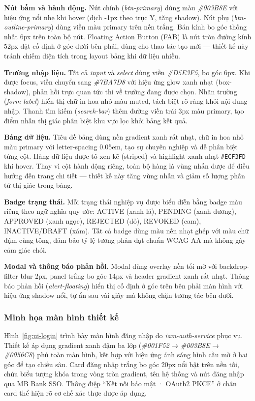 \documentclass[../DoAn.tex]{subfiles}
\begin{document}
\textbf{Nút bấm và hành động.} Nút chính (\textit{btn-primary}) dùng màu \textit{\#003B8E} với hiệu ứng nổi nhẹ khi hover (dịch -1px theo trục Y, tăng shadow). Nút phụ (\textit{btn-outline-primary}) dùng viền màu primary trên nền trắng. Bán kính bo góc thống nhất 6px trên toàn bộ nút. Floating Action Button (FAB) là nút tròn đường kính 52px đặt cố định ở góc dưới bên phải, dùng cho thao tác tạo mới --- thiết kế này tránh chiếm diện tích trong layout bảng khi dữ liệu nhiều.

\textbf{Trường nhập liệu.} Tất cả \textit{input} và \textit{select} dùng viền \textit{\#D5E3F5}, bo góc 6px. Khi được focus, viền chuyển sang \textit{\#7BA7D8} với hiệu ứng glow xanh nhạt (box-shadow), phản hồi trực quan tức thì về trường đang được chọn. Nhãn trường (\textit{form-label}) hiển thị chữ in hoa nhỏ màu muted, tách biệt rõ ràng khỏi nội dung nhập. Thanh tìm kiếm (\textit{search-bar}) thêm đường viền trái 3px màu primary, tạo điểm nhấn thị giác phân biệt khu vực lọc khỏi bảng kết quả.

\textbf{Bảng dữ liệu.} Tiêu đề bảng dùng nền gradient xanh rất nhạt, chữ in hoa nhỏ màu primary với letter-spacing 0.05em, tạo sự chuyên nghiệp và dễ phân biệt từng cột. Hàng dữ liệu được tô xen kẽ (striped) và highlight xanh nhạt \texttt{\#ECF3FD} khi hover. Thay vì cột hành động riêng, toàn bộ hàng là vùng nhấn được để điều hướng đến trang chi tiết --- thiết kế này tăng vùng nhấn và giảm số lượng phần tử thị giác trong bảng.

\textbf{Badge trạng thái.} Mỗi trạng thái nghiệp vụ được biểu diễn bằng badge màu riêng theo ngữ nghĩa quy ước: ACTIVE (xanh lá), PENDING (xanh dương), APPROVED (xanh ngọc), REJECTED (đỏ), REVOKED (cam), INACTIVE/DRAFT (xám). Tất cả badge dùng màu nền nhạt ghép với màu chữ đậm cùng tông, đảm bảo tỷ lệ tương phản đạt chuẩn WCAG AA mà không gây cảm giác chói.

\textbf{Modal và thông báo phản hồi.} Modal dùng overlay nền tối mờ với backdrop-filter blur 2px, panel trắng bo góc 14px và header gradient xanh rất nhạt. Thông báo phản hồi (\textit{alert-floating}) hiển thị cố định ở góc trên bên phải màn hình với hiệu ứng shadow nổi, tự ẩn sau vài giây mà không chặn tương tác bên dưới.

\subsubsection{Minh họa màn hình thiết kế}

Hình~\ref{fig:ui-login} trình bày màn hình đăng nhập do \textit{iam-auth-service} phục vụ. Thiết kế áp dụng gradient xanh đậm ba lớp (\textit{\#001F52} → \textit{\#003B8E} → \textit{\#0056C8}) phủ toàn màn hình, kết hợp với hiệu ứng ánh sáng hình cầu mờ ở hai góc để tạo chiều sâu. Card đăng nhập trắng bo góc 20px nổi bật trên nền tối, chứa biểu tượng khóa trong vòng tròn gradient, tên hệ thống và nút đăng nhập qua MB Bank SSO. Thông điệp ``Kết nối bảo mật · OAuth2 PKCE'' ở chân card thể hiện rõ cơ chế xác thực được áp dụng.
\end{document}
